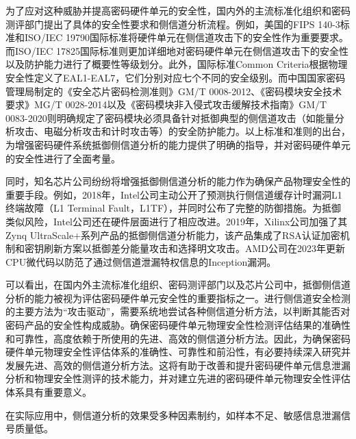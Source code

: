 {	%
	
	为了应对这种威胁并提高密码硬件单元的安全性，国内外的主流标准化组织和密码测评部门提出了具体的安全性要求和侧信道分析流程。例如，美国的FIPS 140-3标准\citep{FIPS140-3}和ISO/IEC 19790\citep{ISO/IEC19790}国际标准将硬件单元在侧信道攻击下的安全性作为重要要求。而ISO/IEC 17825\citep{ISO/IEC17825}国际标准则更加详细地对密码硬件单元在侧信道攻击下的安全性以及防护能力进行了概要性等级划分。此外，国际标准Common Criteria\citep{CCMB-2017-04-001}根据物理安全性定义了EAL1-EAL7，它们分别对应七个不同的安全级别。而中国国家密码管理局制定的《安全芯片密码检测准则》GM/T 0008-2012\citep{GM/T0008}、《密码模块安全技术要求》MG/T 0028-2014\citep{GM/T0028}以及《密码模块非入侵式攻击缓解技术指南》GM/T 0083-2020\citep{GM/T0083}则明确规定了密码模块必须具备针对抵御典型的侧信道攻击（如能量分析攻击、电磁分析攻击和计时攻击等）的安全防护能力。以上标准和准则的出台，为增强密码硬件系统抵御侧信道分析的能力提供了明确的指导，并对密码硬件单元的安全性进行了全面考量。
	
	同时，知名芯片公司纷纷将增强抵御侧信道分析的能力作为确保产品物理安全性的重要手段。例如，2018年，Intel公司主动公开了预测执行侧信道缓存计时漏洞L1终端故障（L1 Terminal Fault，L1TF），并同时公布了完整的防御措施\citep{L1TF}。为抵御类似风险，Intel公司还在硬件层面进行了相应改进\citep{AffectedProcessors}。2019年，Xilinx公司加强了其Zynq UltraScale+系列产品的抵御侧信道分析能力，该产品集成了RSA认证加密机制和密钥刷新方案以抵御差分能量攻击和选择明文攻击\citep{UG1085}。AMD公司在2023年更新CPU微代码以防范了通过侧信道泄漏特权信息的Inception漏洞\citep{AMD-SB-7005}。
	
	可以看出，在国内外主流标准化组织、密码测评部门以及芯片公司中，抵御侧信道分析的能力被视为评估密码硬件单元安全性的重要指标之一。进行侧信道安全检测的主要方法为“攻击驱动”，需要系统地尝试各种侧信道分析方法，以判断其能否对密码产品的安全性构成威胁\citep{ISO/IEC15408, GB/T18336}。确保密码硬件单元物理安全性检测评估结果的准确性和可靠性，高度依赖于所使用的先进、高效的侧信道分析方法。因此，为确保密码硬件单元物理安全性评估体系的准确性、可靠性和前沿性，有必要持续深入研究并发展先进、高效的侧信道分析方法。这将有助于改善和提升密码硬件单元信息泄漏分析和物理安全性测评的技术能力，并对建立先进的密码硬件单元物理安全性评估体系具有重要意义。
	
	在实际应用中，侧信道分析的效果受多种因素制约{\color{\xchange}，如样本不足、敏感信息泄漏信号质量低}。
	
}
